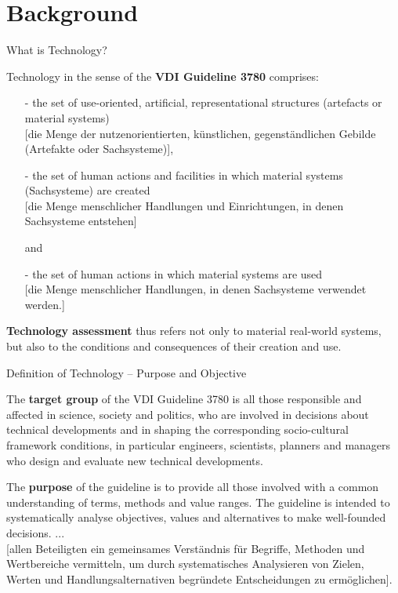 \documentclass{beamer}
\title{Modelling Sustainable Systems\\ and Semantic Web\\[6pt] Technology
  \vskip1em}
\subtitle{Lecture in the Module 10-202-2312\\ for Master Computer Science}
\author{Prof. Dr. Hans-Gert Gräbe\\
\url{http://www.informatik.uni-leipzig.de/~graebe}}
\date{April 2022}
\begin{document}
{
\begin{frame}
  \titlepage
\end{frame}}

\section{Background}
\begin{frame}{What is Technology?}

  Technology in the sense of the \textbf{VDI Guideline 3780} comprises:
  \small\vspace{-1em}
\begin{itemize}
\item[-] the set of use-oriented, artificial, representational structures
  (artefacts or material systems)\\{} [die Menge der nutzenorientierten,
  künstlichen, gegenständlichen Gebilde (Artefakte oder Sachsysteme)],
\item[-] the set of human actions and facilities in which material systems
  (Sachsysteme) are created\\{} [die Menge menschlicher Handlungen und
  Einrichtungen, in denen Sachsysteme entstehen]

  and
\item[-] the set of human actions in which material systems are used\\{} [die
  Menge menschlicher Handlungen, in denen Sachsysteme verwendet werden.]
\end{itemize}\vspace{-1em}
\normalsize
  \textbf{Technology assessment} thus refers not only to material real-world
  systems, but also to the conditions and consequences of their creation and
  use.
\end{frame}

\begin{frame}{Definition of Technology -- Purpose and Objective}

The \textbf{target group} of the VDI Guideline 3780 is all those responsible
and affected in science, society and politics, who are involved in decisions
about technical developments and in shaping the corresponding socio-cultural
framework conditions, in particular engineers, scientists, planners and
managers who design and evaluate new technical developments.

The \textbf{purpose} of the guideline is to provide all those involved with a
common understanding of terms, methods and value ranges. The guideline is
intended to systematically analyse objectives, values and alternatives to make
well-founded decisions. ... \\{} [allen Beteiligten ein gemeinsames
  Verständnis für Begriffe, Methoden und Wertbereiche vermitteln, um durch
  systematisches Analysieren von Zielen, Werten und Handlungsalternativen
  begründete Entscheidungen zu ermöglichen].

\end{frame}
\end{document}
